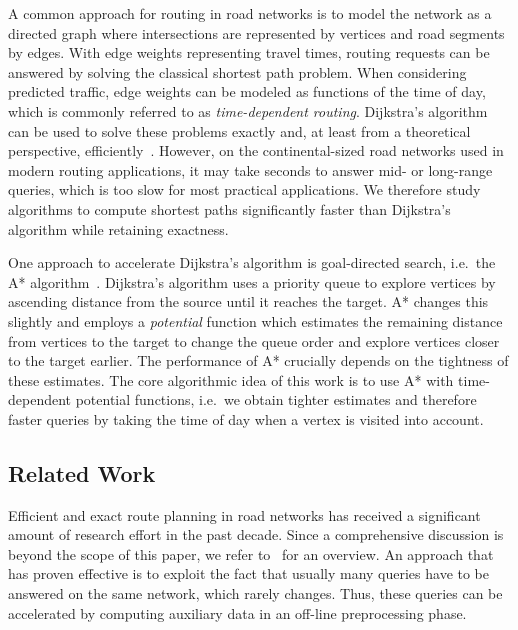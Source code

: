 \documentclass[a4paper,UKenglish,cleveref, autoref, thm-restate,anonymous]{lipics-v2021}
\begin{document}
A common approach for routing in road networks is to model the network as a directed graph where intersections are represented by vertices and road segments by edges.
With edge weights representing travel times, routing requests can be answered by solving the classical shortest path problem.
When considering predicted traffic, edge weights can be modeled as functions of the time of day, which is commonly referred to as \emph{time-dependent routing}.
Dijkstra's algorithm can be used to solve these problems exactly and, at least from a theoretical perspective, efficiently~\cite{d-ntpcg-59}.
However, on the continental-sized road networks used in modern routing applications, it may take seconds to answer mid- or long-range queries, which is too slow for most practical applications.
We therefore study algorithms to compute shortest paths significantly faster than Dijkstra's algorithm while retaining exactness.

One approach to accelerate Dijkstra's algorithm is goal-directed search, i.e.\ the A* algorithm~\cite{hnr-afbhd-68}.
Dijkstra's algorithm uses a priority queue to explore vertices by ascending distance from the source until it reaches the target.
A* changes this slightly and employs a \emph{potential} function which estimates the remaining distance from vertices to the target to change the queue order and explore vertices closer to the target earlier.
The performance of A* crucially depends on the tightness of these estimates.
The core algorithmic idea of this work is to use A* with time-dependent potential functions, i.e.\ we obtain tighter estimates and therefore faster queries by taking the time of day when a vertex is visited into account.

\subsection{Related Work}

Efficient and exact route planning in road networks has received a significant amount of research effort in the past decade.
Since a comprehensive discussion is beyond the scope of this paper, we refer to~\cite{bdgmpsww-rptn-16} for an overview.
An approach that has proven effective is to exploit the fact that usually many queries have to be answered on the same network, which rarely changes.
Thus, these queries can be accelerated by computing auxiliary data in an off-line preprocessing phase.
\end{document}
